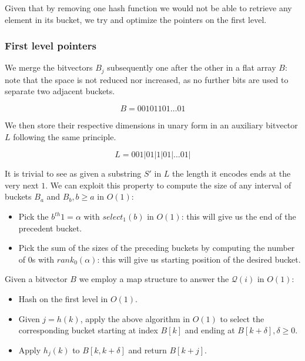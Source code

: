 Given that by removing one hash function we would not be able to retrieve any element in its bucket, we try and optimize the pointers on the first level.

\subsubsection{First level pointers}
We merge the bitvectors $B_j$ subsequently one after the other in a flat array $B$: note that the space is not reduced nor increased, as no further bits are used to separate two adjacent buckets.

\begin{equation*}
B = 0 0 1 0 1 1 0 1 \dots 0 1
\end{equation*}

We then store their respective dimensions in unary form in an auxiliary bitvector $L$ following the same principle.

\begin{equation*}
L = 0 0 1 | 0 1 | 1 | 0 1 | \dots 0 1 |
\end{equation*}


It is trivial to see as given a substring $S'$ in $L$ the length it encodes ends
at the very next $1$.
We can exploit this property to compute the size of any interval of buckets $B_a$
and $B_b, b \geq a$ in $O(1)$:
\begin{itemize}
\item Pick the $b^{th} 1 = \alpha $ with $select_1(b)$ in $O(1)$: this will give
us the end of the precedent bucket.
\item Pick the sum of the sizes of the preceding buckets by computing the number
of $0$s with $rank_0(\alpha)$: this will give us starting position of the desired bucket.
\end{itemize}

Given a bitvector $B$ we employ a map structure to answer the $\mathcal{Q}(i)$ in $O(1)$:
\begin{itemize}
\item Hash on the first level in $O(1)$.
\item Given $j = h(k)$, apply the above algorithm in $O(1)$ to select the corresponding
bucket starting at index $B[k]$ and ending at $B[k + \delta], \delta \geq 0$.
\item Apply $h_j(k)$ to $B[k, k + \delta]$ and return $B[k + j]$.
\end{itemize}


